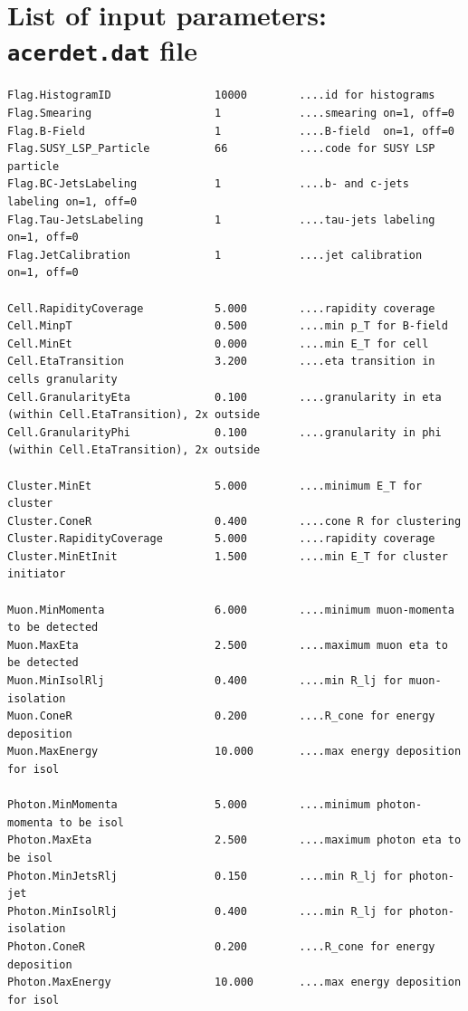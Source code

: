 \section{List of input parameters: {\tt acerdet.dat} file}
{\scriptsize
\begin{verbatim}  
Flag.HistogramID                10000        ....id for histograms
Flag.Smearing                   1            ....smearing on=1, off=0
Flag.B-Field                    1            ....B-field  on=1, off=0
Flag.SUSY_LSP_Particle          66           ....code for SUSY LSP particle
Flag.BC-JetsLabeling            1            ....b- and c-jets labeling on=1, off=0
Flag.Tau-JetsLabeling           1            ....tau-jets labeling on=1, off=0
Flag.JetCalibration             1            ....jet calibration  on=1, off=0

Cell.RapidityCoverage           5.000        ....rapidity coverage
Cell.MinpT                      0.500        ....min p_T for B-field
Cell.MinEt                      0.000        ....min E_T for cell 
Cell.EtaTransition              3.200        ....eta transition in cells granularity
Cell.GranularityEta             0.100        ....granularity in eta (within Cell.EtaTransition), 2x outside
Cell.GranularityPhi             0.100        ....granularity in phi (within Cell.EtaTransition), 2x outside

Cluster.MinEt                   5.000        ....minimum E_T for cluster
Cluster.ConeR                   0.400        ....cone R for clustering 
Cluster.RapidityCoverage        5.000        ....rapidity coverage
Cluster.MinEtInit               1.500        ....min E_T for cluster initiator

Muon.MinMomenta                 6.000        ....minimum muon-momenta to be detected
Muon.MaxEta                     2.500        ....maximum muon eta to be detected
Muon.MinIsolRlj                 0.400        ....min R_lj for muon-isolation
Muon.ConeR                      0.200        ....R_cone for energy deposition 
Muon.MaxEnergy                  10.000       ....max energy deposition for isol

Photon.MinMomenta               5.000        ....minimum photon-momenta to be isol
Photon.MaxEta                   2.500        ....maximum photon eta to be isol
Photon.MinJetsRlj               0.150        ....min R_lj for photon-jet
Photon.MinIsolRlj               0.400        ....min R_lj for photon-isolation
Photon.ConeR                    0.200        ....R_cone for energy deposition 
Photon.MaxEnergy                10.000       ....max energy deposition for isol


\end{verbatim}}
